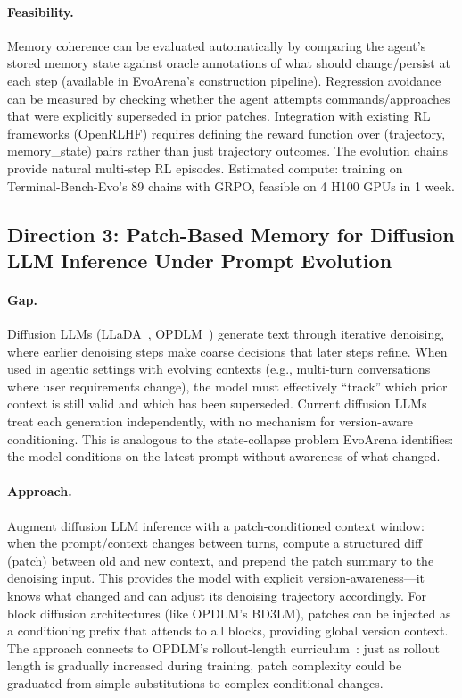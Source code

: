 \documentclass[11pt,a4paper]{article}
\begin{document}
\paragraph{Feasibility.} Memory coherence can be evaluated automatically by comparing the agent's stored memory state against oracle annotations of what should change/persist at each step (available in EvoArena's construction pipeline). Regression avoidance can be measured by checking whether the agent attempts commands/approaches that were explicitly superseded in prior patches. Integration with existing RL frameworks (OpenRLHF) requires defining the reward function over (trajectory, memory\_state) pairs rather than just trajectory outcomes. The evolution chains provide natural multi-step RL episodes. Estimated compute: training on Terminal-Bench-Evo's 89 chains with GRPO, feasible on 4 H100 GPUs in 1 week.

\subsection{Direction 3: Patch-Based Memory for Diffusion LLM Inference Under Prompt Evolution}

\paragraph{Gap.} Diffusion LLMs (LLaDA~\cite{nie2026llada2}, OPDLM~\cite{su2026opdlm}) generate text through iterative denoising, where earlier denoising steps make coarse decisions that later steps refine. When used in agentic settings with evolving contexts (e.g., multi-turn conversations where user requirements change), the model must effectively ``track'' which prior context is still valid and which has been superseded. Current diffusion LLMs treat each generation independently, with no mechanism for version-aware conditioning. This is analogous to the state-collapse problem EvoArena identifies: the model conditions on the latest prompt without awareness of what changed.

\paragraph{Approach.} Augment diffusion LLM inference with a patch-conditioned context window: when the prompt/context changes between turns, compute a structured diff (patch) between old and new context, and prepend the patch summary to the denoising input. This provides the model with explicit version-awareness---it knows what changed and can adjust its denoising trajectory accordingly. For block diffusion architectures (like OPDLM's BD3LM), patches can be injected as a conditioning prefix that attends to all blocks, providing global version context. The approach connects to OPDLM's rollout-length curriculum~\cite{su2026opdlm}: just as rollout length is gradually increased during training, patch complexity could be graduated from simple substitutions to complex conditional changes.
\end{document}
